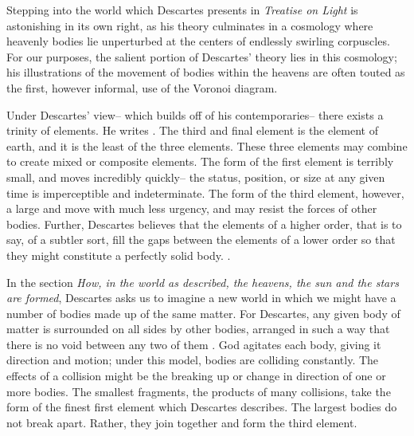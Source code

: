 \documentclass[12pt,twoside]{reedthesis}
\begin{document}
    Stepping into the world which Descartes presents in \emph{Treatise on Light} is astonishing in its own right, as his theory culminates in a cosmology where heavenly bodies lie unperturbed at the centers of endlessly swirling corpuscles. For our purposes, the salient portion of Descartes' theory lies in this cosmology; his illustrations of the movement of bodies within the heavens are often touted as the first, however informal, use of the Voronoi diagram. \par

    Under Descartes' view-- which builds off of his contemporaries-- there exists a trinity of elements. He writes \citep[p. 17]{descartes}. The third and final element is the element of earth, and it is the least  of the three elements. These three elements may combine to create mixed or composite elements. The form of the first element is terribly small, and moves incredibly quickly-- the status, position, or size at any given time is imperceptible and indeterminate. The form of the third element, however, a large and move with much less urgency, and may resist the forces of other bodies. Further, Descartes believes that the elements of a higher order, that is to say, of a subtler sort, fill the gaps between the elements of a lower order so that they might constitute a perfectly solid body.  \citep[][p. 17]{descartes}. \par 

    In the section \emph{How, in the world as described, the heavens, the sun and the stars are formed}, Descartes asks us to imagine a new world in which we might have a number of bodies made up of the same matter. For Descartes, any given body of matter is surrounded on all sides by other bodies, arranged in such a way that there is no void between any two of them \citep[p. 25]{descartes}. God agitates each body, giving it direction and motion; under this model, bodies are colliding constantly. The effects of a collision might be the breaking up or change in direction of one or more bodies. The smallest fragments, the products of many collisions, take the form of the finest first element which Descartes describes. The largest bodies do not break apart. Rather, they join together and form the third element. \par
\end{document}
